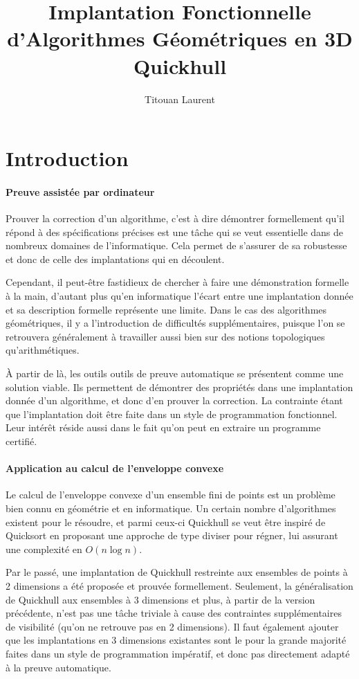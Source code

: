 \documentclass[]{article}
\title{Implantation Fonctionnelle \\ d'Algorithmes Géométriques en 3D \\
  \large Quickhull}
\author{Titouan Laurent}
\date{}
\begin{document}
\maketitle
\section{Introduction}
\paragraph{Preuve assistée par ordinateur}
Prouver la correction d'un algorithme, c'est à dire démontrer formellement qu'il répond à des spécifications précises est une tâche qui se veut essentielle dans de nombreux domaines de l'informatique. Cela permet de s'assurer de sa robustesse et donc de celle des implantations qui en découlent.

Cependant, il peut-être fastidieux de chercher à faire une démonstration formelle à la main, d'autant plus qu'en informatique l'écart entre une implantation donnée et sa description formelle représente une limite. Dans le cas des algorithmes géométriques, il y a l'introduction de difficultés supplémentaires, puisque l'on se retrouvera généralement à travailler aussi bien sur des notions topologiques qu'arithmétiques.

À partir de là, les outils outils de preuve automatique se présentent comme une solution viable. Ils permettent de démontrer des propriétés dans une implantation donnée d'un algorithme, et donc d'en prouver la correction. La contrainte étant que l'implantation doit être faite dans un style de programmation fonctionnel. Leur intérêt réside aussi dans le fait qu'on peut en extraire un programme certifié.

\paragraph{Application au calcul de l'enveloppe convexe}
Le calcul de l'enveloppe convexe d'un ensemble fini de points est un problème bien connu en géométrie et en informatique. Un certain nombre d'algorithmes existent pour le résoudre, et parmi ceux-ci Quickhull se veut être inspiré de Quicksort en proposant une approche de type diviser pour régner, lui assurant une complexité en $O(n\log{}n)$.

Par le passé, une implantation de Quickhull restreinte aux ensembles de points à 2 dimensions a été proposée et prouvée formellement. Seulement, la généralisation de Quickhull aux ensembles à 3 dimensions et plus, à partir de la version précédente, n'est pas une tâche triviale à cause des contraintes supplémentaires de visibilité (qu'on ne retrouve pas en 2 dimensions). Il faut également ajouter que les implantations en 3 dimensions existantes sont le pour la grande majorité faites dans un style de programmation impératif, et donc pas directement adapté à la preuve automatique.
\end{document}
